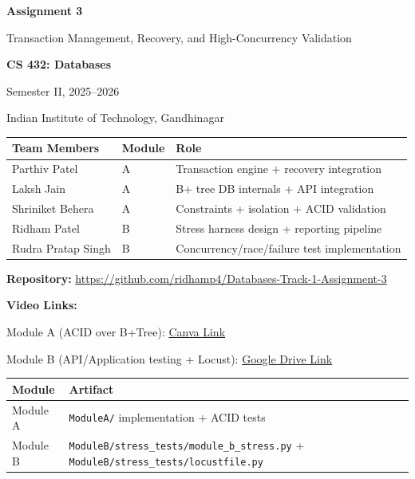 \documentclass[12pt,a4paper]{article}
\begin{document}

\begin{titlepage}
\centering
\vspace*{2cm}
{\Huge\bfseries Assignment 3\par}
\vspace{0.5cm}
{\Large Transaction Management, Recovery, and High-Concurrency Validation\par}
\vspace{1.5cm}
{\large\textbf{CS 432: Databases}\par}
{\large Semester II, 2025--2026\par}
\vspace{1cm}
{\large Indian Institute of Technology, Gandhinagar\par}
\vspace{2cm}

\begin{tabular}{lll}
\hline
\textbf{Team Members} & \textbf{Module} & \textbf{Role} \\
\hline
Parthiv Patel & A & Transaction engine + recovery integration \\
Laksh Jain & A & B+ tree DB internals + API integration \\
Shriniket Behera & A & Constraints + isolation + ACID validation \\
Ridham Patel & B & Stress harness design + reporting pipeline \\
Rudra Pratap Singh & B & Concurrency/race/failure test implementation \\
\hline
\end{tabular}

\vspace{1.5cm}
{\large\textbf{Repository:} \url{https://github.com/ridhamp4/Databases-Track-1-Assignment-3}\par}
\vspace{0.4cm}
{\large\textbf{Video Links:}\par}
{\large Module A (ACID over B+Tree): \href{https://canva.link/xhn5uioz093wiko}{Canva Link}\par}
{\large Module B (API/Application testing + Locust): \href{https://drive.google.com/drive/folders/1JIU-ww6tLI8o2geELsPQ9wfkWjCJDl0t?usp=sharing}{Google Drive Link}\par}
\vspace{0.8cm}
\begin{tabular}{ll}
\hline
\textbf{Module} & \textbf{Artifact} \\
\hline
Module A & \texttt{ModuleA/} implementation + ACID tests \\
Module B & \texttt{ModuleB/stress\_tests/module\_b\_stress.py} + \texttt{ModuleB/stress\_tests/locustfile.py} \\
\hline
\end{tabular}


\end{titlepage}
\end{document}
